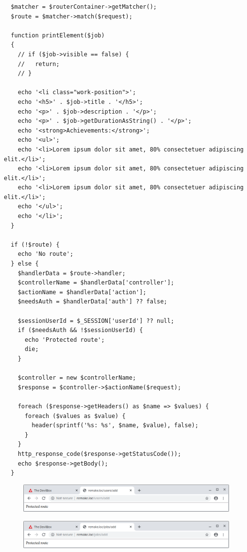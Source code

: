 \documentclass{article}
\begin{document}
\begin{verbatim}
  $matcher = $routerContainer->getMatcher();
  $route = $matcher->match($request);

  function printElement($job)
  {
    // if ($job->visible == false) {
    //   return;
    // }

    echo '<li class="work-position">';
    echo '<h5>' . $job->title . '</h5>';
    echo '<p>' . $job->description . '</p>';
    echo '<p>' . $job->getDurationAsString() . '</p>';
    echo '<strong>Achievements:</strong>';
    echo '<ul>';
    echo '<li>Lorem ipsum dolor sit amet, 80% consectetuer adipiscing elit.</li>';
    echo '<li>Lorem ipsum dolor sit amet, 80% consectetuer adipiscing elit.</li>';
    echo '<li>Lorem ipsum dolor sit amet, 80% consectetuer adipiscing elit.</li>';
    echo '</ul>';
    echo '</li>';
  }

  if (!$route) {
    echo 'No route';
  } else {
    $handlerData = $route->handler;
    $controllerName = $handlerData['controller'];
    $actionName = $handlerData['action'];
    $needsAuth = $handlerData['auth'] ?? false;

    $sessionUserId = $_SESSION['userId'] ?? null;
    if ($needsAuth && !$sessionUserId) {
      echo 'Protected route';
      die;
    }

    $controller = new $controllerName;
    $response = $controller->$actionName($request);

    foreach ($response->getHeaders() as $name => $values) {
      foreach ($values as $value) {
        header(sprintf('%s: %s', $name, $value), false);
      }
    }
    http_response_code($response->getStatusCode());
    echo $response->getBody();
  }
\end{verbatim}

\begin{figure}[h!]
  \centering
  \includegraphics[scale=0.5]{./Pictures/218_addusers_protected.png}
\end{figure}

\begin{figure}[h!]
  \centering
  \includegraphics[scale=0.5]{./Pictures/219_addjobs_protected.png}
\end{figure}
\end{document}
